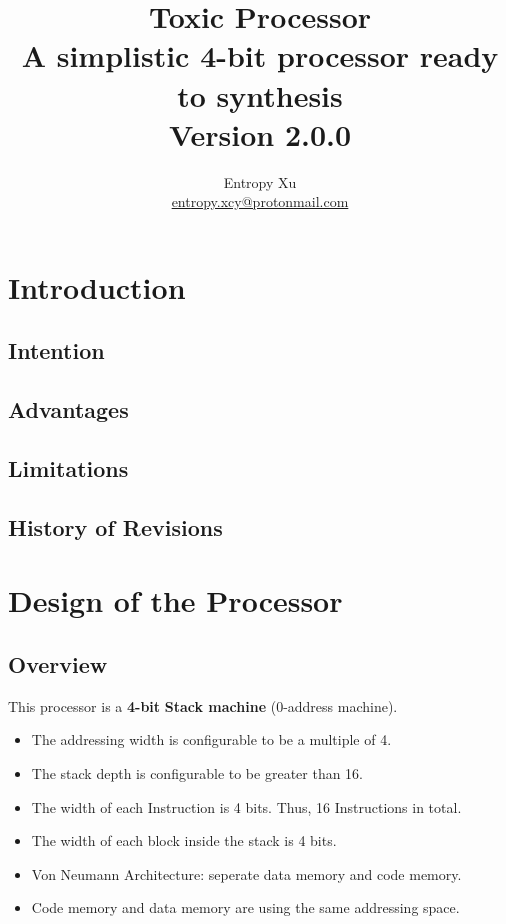 \documentclass[11pt]{report}
\begin{document}
\begin{titlepage}
    \thispagestyle{empty}
    \title{%
    Toxic Processor \\
    \large A simplistic 4-bit processor ready to synthesis \\ 
    Version 2.0.0}
    \author{Entropy Xu \\ 
            \href{mailto:entropy.xcy@protonmail.com}{entropy.xcy@protonmail.com} }
    \maketitle
    \end{titlepage}
    \tableofcontents


    \chapter{Introduction}
    \section{Intention}
    \section{Advantages}
    \section{Limitations}
    \section{History of Revisions}


    \chapter{Design of the Processor}
    \label{chapter:design}
    \section{Overview}
    This processor is a \textbf{4-bit} \textbf{Stack machine} (0-address machine).
    \begin{itemize}
        \item The addressing width is configurable to be a multiple of 4.
        \item The stack depth is configurable to be greater than 16.
        \item The width of each Instruction is 4 bits. Thus, 16 Instructions in total.
        \item The width of each block inside the stack is 4 bits.
        \item Von Neumann Architecture: seperate data memory and code memory.
        \item Code memory and data memory are using the same addressing space.
    \end{itemize}
\end{document}
